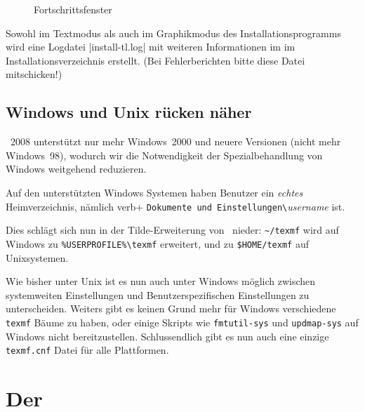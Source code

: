 \begin{figure}[ht!]
  \centering
  \caption{Fortschrittsfenster}
  \label{fig:gui_progress}
\end{figure}

Sowohl im Textmodus als auch im Graphikmodus des Installationsprogramms
wird eine Logdatei |install-tl.log| mit weiteren Informationen im
im Installationsverzeichnis erstellt. (Bei Fehlerberichten bitte diese
Datei mitschicken!)

\subsection{Windows und Unix rücken näher}

\tl\ 2008 unterstützt nur mehr Windows~2000 und neuere Versionen
(nicht mehr Windows~98), wodurch wir die Notwendigkeit der Spezialbehandlung
von Windows weitgehend reduzieren.

Auf den unterstützten Windows Systemen haben Benutzer ein \emph{echtes}
Heimverzeichnis, nämlich verb+%
\verb+Dokumente und Einstellungen\+\textit{username} ist.

Dies schlägt sich nun in der Tilde-Erweiterung von \kpse\ nieder:
\verb+~/texmf+ wird auf Windows zu \verb+%USERPROFILE%\texmf+
erweitert, und zu \verb+$HOME/texmf+ auf Unixsystemen.

Wie bisher unter Unix ist es nun auch unter Windows möglich zwischen
systemweiten Einstellungen und Benutzerspezifischen Einstellungen
zu unterscheiden. Weiters gibt es keinen Grund mehr für Windows
verschiedene \texttt{texmf} Bäume zu haben, oder einige Skripts
wie \texttt{fmtutil-sys} und \texttt{updmap-sys} auf Windows nicht
bereitzustellen. Schlussendlich gibt es nun auch eine einzige
\texttt{texmf.cnf} Datei für alle Plattformen.


%
%
%
\section{Der \tlmgr}

